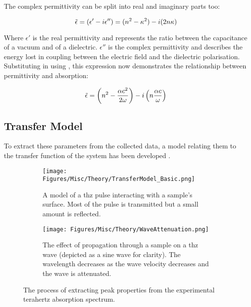 The complex permittivity can be split into real and imaginary parts too:

\begin{equation}
\Tilde{\epsilon} = (\epsilon' - i\epsilon'') = (n^2 - \kappa^2) - i(2n\kappa)
\end{equation}

Where \(\epsilon'\) is the real permittivity and represents the ratio between the capacitance of a vacuum and of a dielectric. \(\epsilon''\) is the complex permittivity and describes the energy lost in coupling between the electric field and the dielectric polarisation. Substituting in using , this expression now demonstrates the relationship between permittivity and absorption:

\begin{equation}
\Tilde{\epsilon} = \left(n^2 - \frac{\alpha c^2}{2\omega}\right) - i\left(n\frac{\alpha c}{\omega}\right)
\end{equation}

\subsection{Transfer Model}
To extract these parameters from the collected data, a model relating them to the transfer function of the system has been developed \DIFdelbegin \DIFdel{~}\DIFdelend \cite{Duvillaret1996}. 

\begin{figure}
\centering
\begin{subfigure}{0.49\textwidth}
    \centering
    \texttt{[image: Figures/Misc/Theory/TransferModel\_Basic.png]}
    \captionsetup{font = footnotesize, justification = centering}
    \caption{A model of a \acrshort{thz} pulse interacting with a sample’s surface. Most of the pulse is transmitted but a small amount is reflected.}
    \label{fig:transfermodel1}
\end{subfigure}
\begin{subfigure}{0.49\textwidth}
    \centering
    \texttt{[image: Figures/Misc/Theory/WaveAttenuation.png]}
    \captionsetup{font = footnotesize, justification = centering}
    \caption{The effect of propagation through a sample on a \acrshort{thz} wave (depicted as a sine wave for clarity). The wavelength decreases as the wave velocity decreases and the wave is attenuated.}
    \label{fig:waveattentuation}
\end{subfigure}
\captionsetup{font = footnotesize, justification = centering}
\caption[Extraction of Experimental Peak Widths]{The process of extracting peak properties from the experimental terahertz absorption spectrum.}
\label{Fig:transfermodel}
\end{figure}

